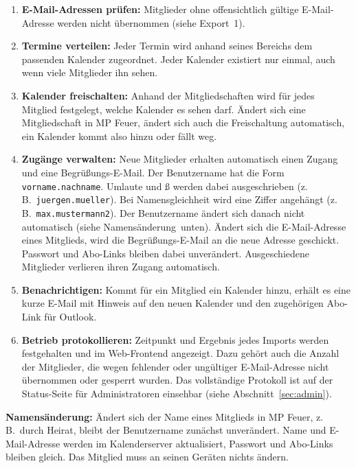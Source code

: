 \documentclass[a4paper,fontsize=10pt]{scrartcl}
\begin{document}
\begin{enumerate}
  \item \textbf{E-Mail-Adressen prüfen:} Mitglieder ohne offensichtlich
        gültige E-Mail-Adresse werden nicht übernommen (siehe Export~1).
  \item \textbf{Termine verteilen:} Jeder Termin wird anhand seines Bereichs
        dem passenden Kalender zugeordnet. Jeder Kalender existiert nur
        einmal, auch wenn viele Mitglieder ihn sehen.
  \item \textbf{Kalender freischalten:} Anhand der Mitgliedschaften wird für
        jedes Mitglied festgelegt, welche Kalender es sehen darf. Ändert sich
        eine Mitgliedschaft in MP Feuer, ändert sich auch die Freischaltung
        automatisch, ein Kalender kommt also hinzu oder fällt weg.
  \item \textbf{Zugänge verwalten:} Neue Mitglieder erhalten automatisch
        einen Zugang und eine Begrüßungs-E-Mail. Der
        Benutzername hat die Form \texttt{vorname.nachname}. Umlaute und ß
        werden dabei ausgeschrieben (z.\,B.\ \texttt{juergen.mueller}). Bei
        Namensgleichheit wird eine Ziffer angehängt (z.\,B.\
        \texttt{max.mustermann2}). Der Benutzername ändert sich danach nicht
        automatisch (siehe \glqq Namensänderung\grqq\ unten).
        Ändert sich die E-Mail-Adresse eines Mitglieds, wird die
        Begrüßungs-E-Mail an die neue Adresse geschickt. Passwort und
        Abo-Links bleiben dabei unverändert.
        Ausgeschiedene Mitglieder verlieren ihren Zugang automatisch.
  \item \textbf{Benachrichtigen:} Kommt für ein Mitglied ein Kalender hinzu,
        erhält es eine kurze E-Mail mit Hinweis auf den neuen Kalender und
        den zugehörigen Abo-Link für Outlook.
  \item \textbf{Betrieb protokollieren:} Zeitpunkt und Ergebnis jedes
        Imports werden festgehalten und im Web-Frontend angezeigt. Dazu
        gehört auch die Anzahl der Mitglieder, die wegen fehlender oder
        ungültiger E-Mail-Adresse nicht übernommen oder gesperrt wurden. Das
        vollständige Protokoll ist auf der Status-Seite für Administratoren
        einsehbar (siehe Abschnitt~\ref{sec:admin}).
\end{enumerate}

\textbf{Namensänderung:} Ändert sich der Name eines Mitglieds in MP Feuer,
z.\,B.\ durch Heirat, bleibt der Benutzername zunächst unverändert. Name und
E-Mail-Adresse werden im Kalenderserver aktualisiert, Passwort und Abo-Links
bleiben gleich. Das Mitglied muss an seinen Geräten nichts ändern.
\end{document}
